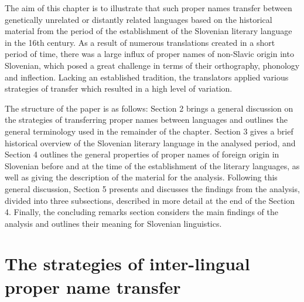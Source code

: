 \documentclass[output=paper,colorlinks,citecolor=brown,arabicfont,chinesefont]{langscibook}
\begin{document}
The aim of this chapter is to illustrate that such proper names transfer between genetically unrelated or distantly related languages based on the historical material from the period of the establishment of the Slovenian literary language in the 16th century. As a result of numerous translations created in a short period of time, there was a large influx of proper names of non-Slavic origin into Slovenian, which posed a great challenge in terms of their orthography, phonology and inflection. Lacking an established tradition, the translators applied various strategies of transfer which resulted in a high level of variation. 

The structure of the paper is as follows: Section 2 brings a general discussion on the strategies of transferring proper names between languages  and outlines the general terminology used in the remainder of the chapter. Section 3 gives a brief historical overview of the Slovenian literary language in the analysed period, and Section 4 outlines the general properties of proper names of foreign origin in Slovenian before and at the time of the establishment of the literary languages, as well as giving the description of the material for the analysis.  Following this general discussion, Section 5 presents and discusses the findings from the analysis, divided into three subsections, described in more detail at the end of the Section 4. Finally, the concluding remarks section considers the main findings of the analysis and outlines their meaning for Slovenian linguistics.

\section{The strategies of inter-lingual proper name transfer}
\end{document}
